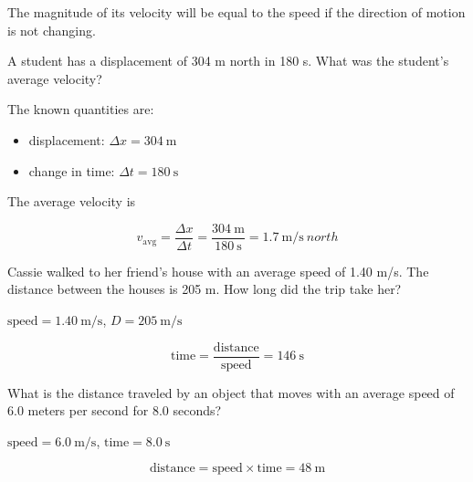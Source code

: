 \documentclass[answers]{exam}
\begin{document}
\begin{questions}
\begin{questions}
\begin{solution}
The magnitude of its velocity will be equal to the speed if the direction of motion is not changing.
\end{solution}


\question
A student has a displacement of 304 m north in 180 s. What was the student's average velocity?

\begin{solution}
The known quantities are:

\begin{itemize}
    \item displacement: $\Delta{x} = \SI{304}{\meter}$
    \item change in time: $\Delta{t} = \SI{180}{\second}$
\end{itemize}

The average velocity is

\begin{equation*}
    v_{\mathrm{avg}} = \frac{\Delta{x}}{\Delta{t}} = \frac{\SI{304}{\meter}}{\SI{180}{\second}} = \SI[per-mode=symbol]{1.7}{\meter\per\second\ north}
\end{equation*}
\end{solution}



\question
Cassie walked to her friend’s house with an average speed of 1.40 m/s. The distance between the houses is 205 m. How long did the trip take her?

\begin{solution}
    $\text{speed} = \SI{1.40}{\meter/\second}$, $D = \SI{205}{\meter/\second}$

\begin{equation*}
    \text{time} = \frac{\text{distance}}{\text{speed}} = \SI{146}{\second}
\end{equation*}
\end{solution}

\question
What is the distance traveled by an object that moves with an average speed of 6.0 meters per second for 8.0 seconds?

\begin{solution}
    $\text{speed} = \SI{6.0}{\meter/\second}$, $\text{time} = \SI{8.0}{\second}$

\begin{equation*}
    \text{distance} = \text{speed} \times \text{time} = \SI{48}{\meter} 
\end{equation*}
\end{solution}



\end{questions}
\end{questions}
\end{document}
